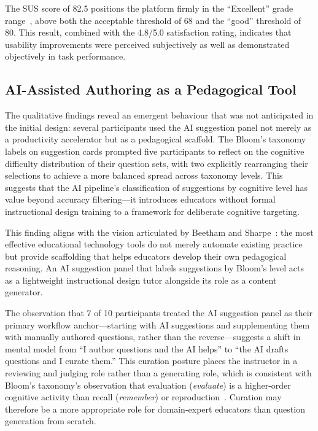The SUS score of 82.5 positions the platform firmly in the ``Excellent''
grade range~\cite{brooke1996}, above both the acceptable threshold of 68
and the ``good'' threshold of 80. This result, combined with the 4.8/5.0
satisfaction rating, indicates that usability improvements were perceived
subjectively as well as demonstrated objectively in task performance.

\subsection{AI-Assisted Authoring as a Pedagogical Tool}

The qualitative findings reveal an emergent behaviour that was not
anticipated in the initial design: several participants used the AI
suggestion panel not merely as a productivity accelerator but as a
pedagogical scaffold. The Bloom's taxonomy labels on suggestion cards
prompted five participants to reflect on the cognitive difficulty
distribution of their question sets, with two explicitly rearranging their
selections to achieve a more balanced spread across taxonomy levels. This
suggests that the AI pipeline's classification of suggestions by cognitive
level has value beyond accuracy filtering---it introduces educators without
formal instructional design training to a framework for deliberate cognitive
targeting.

This finding aligns with the vision articulated by Beetham and
Sharpe~\cite{beetham2019}: the most effective educational technology tools
do not merely automate existing practice but provide scaffolding that helps
educators develop their own pedagogical reasoning. An AI suggestion panel
that labels suggestions by Bloom's level acts as a lightweight instructional
design tutor alongside its role as a content generator.

The observation that 7 of 10 participants treated the AI suggestion panel
as their primary workflow anchor---starting with AI suggestions and
supplementing them with manually authored questions, rather than the
reverse---suggests a shift in mental model from ``I author questions and
the AI helps'' to ``the AI drafts questions and I curate them.'' This curation
posture places the instructor in a reviewing and judging role rather than a
generating role, which is consistent with Bloom's taxonomy's observation
that evaluation (\emph{evaluate}) is a higher-order cognitive activity than
recall (\emph{remember}) or reproduction~\cite{anderson2001}. Curation may
therefore be a more appropriate role for domain-expert educators than
question generation from scratch.

